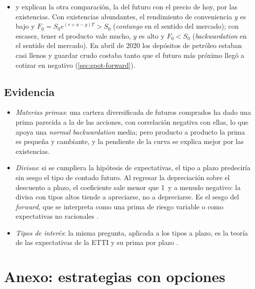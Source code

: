 \documentclass[11pt]{article}
\begin{document}
\begin{itemize}
\item \textcite{Kaldor1939Speculation} y \textcite{Working1949Theory} explican la otra comparación, la del futuro con el precio de hoy, por las existencias. Con existencias abundantes, el rendimiento de conveniencia $y$ es bajo y $F_0=S_0e^{(r+u-y)T}>S_0$ (\emph{contango} en el sentido del mercado); con escasez, tener el producto vale mucho, $y$ es alto y $F_0<S_0$ (\emph{backwardation} en el sentido del mercado). En abril de 2020 los depósitos de petróleo estaban casi llenos y guardar crudo costaba tanto que el futuro más próximo llegó a cotizar en negativo (\ref{sec:spot-forward}).
\end{itemize}

\subsection{Evidencia}

\begin{itemize}
\item \emph{Materias primas}: una cartera diversificada de futuros comprados ha dado una prima parecida a la de las acciones, con correlación negativa con ellas, lo que apoya una \emph{normal backwardation} media\nocite{GortonRouwenhorst2006Facts}; pero producto a producto la prima es pequeña y cambiante, y la pendiente de la curva se explica mejor por las existencias\nocite{FamaFrench1987Commodity}.
\item \emph{Divisas}: si se cumpliera la hipótesis de expectativas, el tipo a plazo predeciría sin sesgo el tipo de contado futuro. Al regresar la depreciación sobre el descuento a plazo, el coeficiente sale menor que 1~y a menudo negativo: la divisa con tipos altos tiende a apreciarse, no a depreciarse. Es el sesgo del \emph{forward}\nocite{Fama1984Forward}, que se interpreta como una prima de riesgo variable o como expectativas no racionales  .
\item \emph{Tipos de interés}: la misma pregunta, aplicada a los tipos a plazo, es la teoría de las expectativas de la ETTI y su prima por plazo .
\end{itemize}

\section{Anexo: estrategias con opciones}\label{anexo:estrategias}
\end{document}
